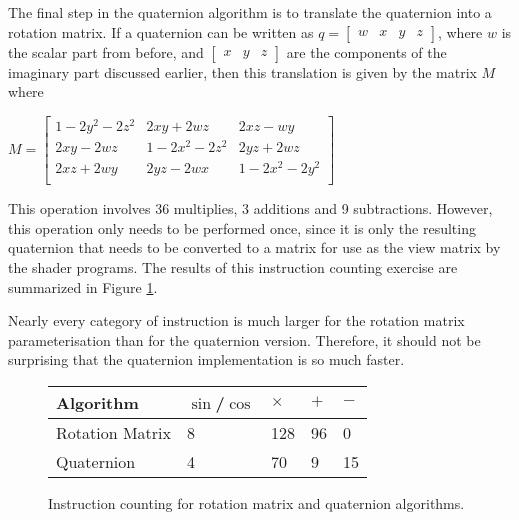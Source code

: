 \documentclass{acm_proc_article-sp}
\begin{document}
The final step in the quaternion algorithm is to translate the quaternion into a rotation matrix.
If a quaternion can be written as $q = \left[ \begin{array}{cccc} w & x & y & z \end{array} \right]$, where $w$ is the scalar part from before, and $\left[ \begin{array}{ccc} x & y & z \end{array} \right]$ are the components of the imaginary part discussed earlier, then this translation is given by the matrix $M$ where

$M = \left[ \begin{array}{ccc}
    1 - 2y^2 - 2z^2 & 2xy + 2wz & 2xz - wy \\
    2xy - 2wz & 1 - 2x^2 - 2z^2 & 2yz + 2wz \\
    2xz + 2wy & 2yz - 2wx & 1 - 2x^2 - 2y^2 \\
    \end{array}\right]$

This operation involves 36 multiplies, 3 additions and 9 subtractions.
However, this operation only needs to be performed once, since it is only the resulting quaternion that needs to be converted to a matrix for use as the view matrix by the shader programs.
The results of this instruction counting exercise are summarized in Figure \ref{fig:counting}.

Nearly every category of instruction is much larger for the rotation matrix parameterisation than for the quaternion version.
Therefore, it should not be surprising that the quaternion implementation is so much faster.

\begin{figure}
\begin{framed}
\begin{tabular}{l|l|l|l|l}
    Algorithm       & $\sin$/$\cos$  & $\times$      & $+$       & $-$  \\
    \hline
    Rotation Matrix & 8              & 128           & 96        & 0             \\
    Quaternion      & 4              & 70            & 9         & 15            \\

\end{tabular}
\caption{Instruction counting for rotation matrix and quaternion algorithms.}
\label{fig:counting}
\end{framed}
\end{figure}
\end{document}
